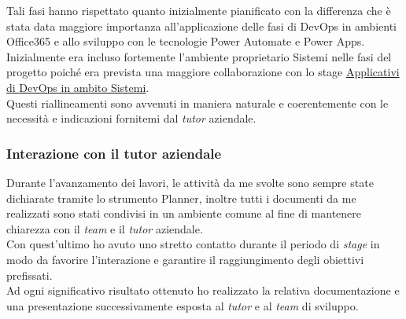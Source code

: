 \noindent Tali fasi hanno rispettato quanto inizialmente pianificato con la differenza che è stata data maggiore importanza all'applicazione delle fasi di \gls{DevOps} in ambienti Office365 e allo sviluppo con le tecnologie Power Automate e Power Apps.\\
Inizialmente era incluso fortemente l'ambiente proprietario \gls{Sistemi} nelle fasi del progetto poiché era prevista una maggiore collaborazione con lo stage \hyperref[stageDavide]{Applicativi di \gls{DevOps} in ambito Sistemi}.\\
Questi riallineamenti sono avvenuti in maniera naturale e coerentemente con le necessità e indicazioni fornitemi dal \emph{tutor} aziendale.\\
\subsubsection*{Interazione con il tutor aziendale}
Durante l'avanzamento dei lavori, le attività da me svolte sono sempre state dichiarate tramite lo strumento Planner, inoltre tutti i documenti da me realizzati sono stati condivisi in un ambiente comune al fine di mantenere chiarezza con il \emph{team} e il \emph{tutor} aziendale.\\
Con quest'ultimo ho avuto uno stretto contatto durante il periodo di \emph{stage} in modo da favorire l'interazione e garantire il raggiungimento degli obiettivi prefissati.\\
Ad ogni significativo risultato ottenuto ho realizzato la relativa documentazione e una presentazione successivamente esposta al \emph{tutor} e al \emph{team} di sviluppo.\\

